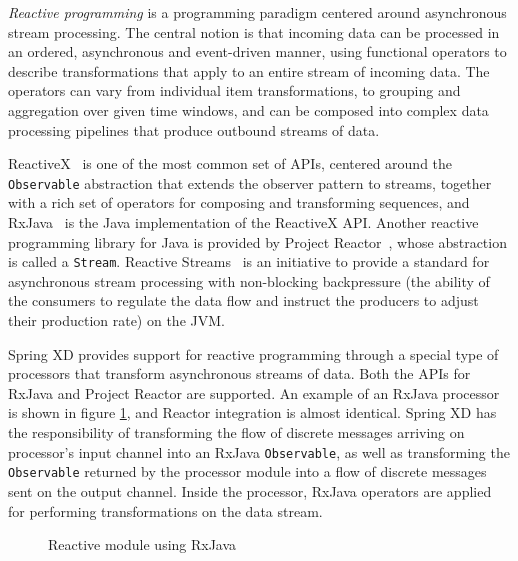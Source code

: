 \emph{Reactive programming} is a programming paradigm centered around asynchronous
stream processing. The central notion is that incoming data can be processed in an
ordered, asynchronous and event-driven manner, using functional operators to describe
transformations that apply to an entire stream of incoming data. The operators can
vary from individual item transformations, to grouping and aggregation over given
time windows, and can be composed into complex data processing pipelines that produce
outbound streams of data.

ReactiveX~\cite{reactivex} is one of the most common set of APIs, centered around
the \texttt{Observable} abstraction that extends the observer pattern to streams,
together with a rich set of operators for composing and transforming sequences, and
RxJava~\cite{rxjava} is the Java implementation of the ReactiveX API. Another
reactive programming library for Java is provided by Project 
Reactor~\cite{projectreactor}, whose abstraction is called a \texttt{Stream}.
Reactive Streams~\cite{reactivestreams} is an initiative to provide a standard for
asynchronous stream processing with non-blocking backpressure (the ability of the
consumers to regulate the data flow and instruct the producers to adjust their
production rate) on the JVM.

Spring XD provides support for reactive programming \linebreak
through a special type of processors that transform asynchronous
streams of data. Both the APIs for RxJava and Project Reactor are
supported. An example of an RxJava processor is shown in
figure \ref{fig:rxjava}, and Reactor integration is almost identical. Spring XD
has the responsibility of transforming the flow of discrete messages arriving
on processor's input channel into an RxJava \texttt{Observable}, as well as
transforming the \texttt{Observable} returned by the processor module into a
flow of discrete messages sent on the output channel. Inside the processor,
RxJava operators are applied for performing transformations on the data stream.

\begin{figure}[ht]
\centering
{}
\caption{Reactive module using RxJava}
\label{fig:rxjava}
\end{figure}


